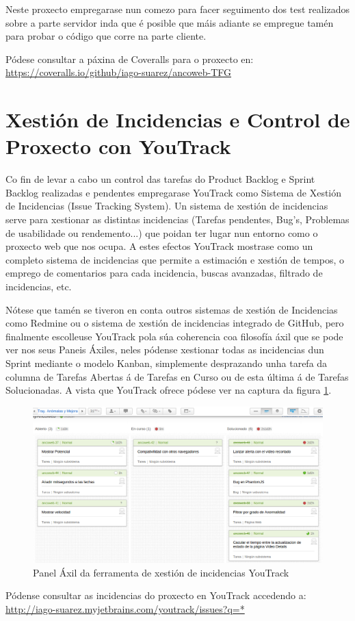    Neste proxecto empregarase nun comezo para facer seguimento dos test realizados sobre a parte 
    servidor inda que é posible que máis adiante se empregue tamén para probar o código que corre 
    na parte cliente.
    
    Pódese consultar a páxina de Coveralls para o proxecto en:\\
    \url{https://coveralls.io/github/iago-suarez/ancoweb-TFG}

\section{Xestión de Incidencias e Control de Proxecto con YouTrack}
    Co fin de levar a cabo un control das tarefas do Product Backlog e Sprint Backlog realizadas e 
    pendentes empregarase YouTrack como Sistema de Xestión de Incidencias (Issue Tracking System). 
    Un sistema de xestión de incidencias serve para xestionar as distintas incidencias (Tarefas 
    pendentes, Bug's, Problemas de usabilidade ou rendemento...) que poidan ter lugar nun entorno 
    como o proxecto web que nos ocupa. A estes efectos YouTrack mostrase como un completo sistema 
    de incidencias que permite a estimación e xestión de tempos, o emprego de comentarios para cada
    incidencia, buscas avanzadas, filtrado de incidencias, etc.
    
    Nótese que tamén se tiveron en conta outros sistemas de xestión de Incidencias como Redmine ou
    o sistema de xestión de incidencias integrado de GitHub, pero finalmente escolleuse YouTrack 
    pola súa coherencia coa filosofía áxil que se pode ver nos seus Paneis Áxiles, neles pódense
    xestionar todas as incidencias dun Sprint mediante o modelo Kanban, simplemente desprazando unha
    tarefa da columna de Tarefas Abertas á de Tarefas en Curso ou de esta última á de Tarefas 
    Solucionadas. A vista que YouTrack ofrece pódese ver na captura da figura \ref{fig:AgilePanel}.
    
    \begin{figure}[htp]
    \begin{center}
        \includegraphics[scale=0.4]{figures/AgilePanel.png}
        \caption{Panel Áxil da ferramenta de xestión de incidencias YouTrack}
    \label{fig:AgilePanel}
    \end{center}
    \end{figure}
    
    Pódense consultar as incidencias do proxecto en YouTrack accedendo a:\\
    \url{http://iago-suarez.myjetbrains.com/youtrack/issues?q=*}
    
    


